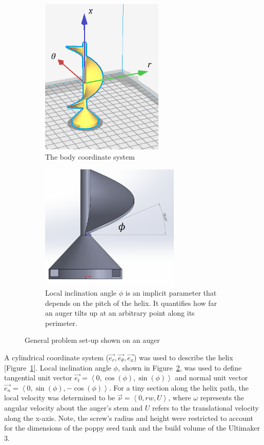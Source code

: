 \documentclass[letterpaper, 11 pt]{article}
\begin{document}
\begin{figure}[H]
\centering
\begin{subfigure}{.5\textwidth}
	\centering
	\includegraphics[height=7.5cm]{./imgs/helix_csys}
	\caption{The body coordinate system}
	\label{fig:helix_csys}
\end{subfigure}%
\begin{subfigure}{.5\textwidth}
	\centering
	\includegraphics[height=6cm]{./imgs/helix_phi}
	\caption{Local inclination angle $\phi$ is an implicit parameter that depends on the pitch of the helix. It quantifies how far an auger tilts up at an arbitrary point along its perimeter.}
	\label{fig:helix_phi}
\end{subfigure}
\caption{General problem set-up shown on an auger}
\label{probSetup}
\end{figure}
 
A cylindrical coordinate system ($\vec{e_r}, \vec{e_\theta}, \vec{e_x}$) was used to describe the helix [Figure~\ref{fig:helix_csys}]. Local inclination angle $\phi$, shown in Figure~\ref{fig:helix_phi}, was used to define tangential unit vector $\vec{e_t} = \left\langle 0, \cos(\phi),\sin(\phi)\right\rangle $ and normal unit vector $\vec{e_n} = \left\langle 0, \sin(\phi), -\cos(\phi)\right\rangle $. For a tiny section along the helix path, the local velocity was determined to be $\vec{\nu} = \left\langle 0, rw, U\right\rangle $, where $\omega$ represents the angular velocity about the auger's stem and $U$ refers to the translational velocity along the x-axis. Note, the screw's radius and height were restricted to account for the dimensions of the poppy seed tank and the build volume of the Ultimaker 3.  
\end{document}
